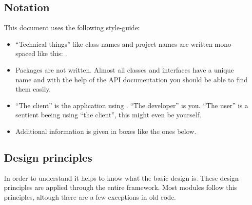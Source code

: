 \subsection{Notation}
This document uses the following style-guide:

\begin{itemize}
 \item ``Technical things'' like class names and project names are written mono-spaced like this: .
 \item Packages are not written. Almost all classes and interfaces have a unique name and with the help of the API documentation you should be able to find them easily.
 \item ``The client'' is the application using . ``The developer'' is you. ``The user'' is a sentient beeing using ``the client'', this might even be yourself.
 \item Additional information is given in boxes like the ones below.
\end{itemize}






\subsection{Design principles}
In order to understand  it helps to know what the basic design is. These design principles are applied through the entire framework. Most modules follow this principles, altough there are a few exceptions in old code.

